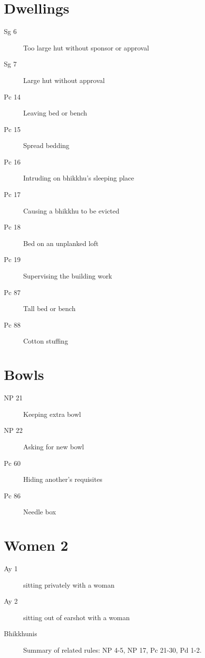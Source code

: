 \documentclass[11pt,oneside]{memoir}
\begin{document}
\begin{multicols}{2}

\section{Dwellings}

\begin{description}
\item[Sg 6 \orig] Too large hut without sponsor or approval%
\item[Sg 7] Large hut without approval
\item[Pc 14] Leaving bed or bench
\item[Pc 15] Spread bedding
\item[Pc 16 \orig] Intruding on bhikkhu's sleeping place%
\item[Pc 17] Causing a bhikkhu to be evicted
\item[Pc 18] Bed on an unplanked loft
\item[Pc 19] Supervising the building work
\item[Pc 87] Tall bed or bench
\item[Pc 88] Cotton stuffing
\end{description}

\columnbreak

\section{Bowls}

\begin{description}
\item[NP 21] Keeping extra bowl
\item[NP 22] Asking for new bowl
\item[Pc 60] Hiding another's requisites
\item[Pc 86] Needle box
\end{description}

\section{Women 2}

\begin{description}
\item[Ay 1] sitting privately with a woman
\item[Ay 2] sitting out of earshot with a woman
\item[Bhikkhunis] Summary of related rules: NP 4-5, NP 17, Pc 21-30, Pd 1-2.
\end{description}

\end{multicols}
\end{document}
